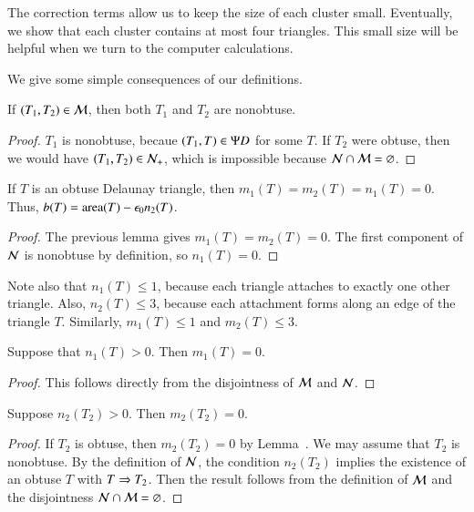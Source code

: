 The correction terms allow us to keep the size of each cluster small.  Eventually, we show that each
cluster contains at most four triangles.  This small size will be helpful when we turn to the computer calculations.

We give  some simple consequences of our definitions.

\begin{lemma} If $(T_1,T_2)\in \mathcal M$, then both $T_1$ and $T_2$ are nonobtuse.
\end{lemma}

\begin{proof}  $T_1$ is nonobtuse, becaue $(T_1,T)\in\Psi D$ for some $T$.
If $T_2$ were obtuse, then we would have $(T_1,T_2)\in \mathcal N_+$, which is impossible
because $\mathcal N\cap \mathcal M = \varnothing$.
\end{proof}

\begin{lemma}[obtuse $b$]  If $T$ is an obtuse Delaunay triangle, then $m_1(T)=m_2(T)=n_1(T)=0$.
Thus, $b(T) = {\operatorname{area}}(T) - \epsilon_0 n_2(T)$.
\end{lemma}

\begin{proof}  The previous lemma gives $m_1(T)=m_2(T)=0$.  The first component of
$\mathcal N$ is nonobtuse by definition, so $n_1(T)=0$.
\end{proof}

\begin{remark}
  Note also that $n_1(T)\le 1$, because each triangle attaches to
  exactly one other triangle.  Also, $n_2(T)\le 3$, because each
  attachment forms along an edge of the triangle $T$.  Similarly,
  $m_1(T)\le 1$ and $m_2(T)\le 3$.
\end{remark}

\begin{lemma}  Suppose that $n_1(T)>0$. Then $m_1(T)=0$.
\end{lemma}

\begin{proof} This follows directly from the disjointness of $\mathcal M$ and $\mathcal N$.
\end{proof}

\begin{lemma}  Suppose $n_2(T_2)>0$.  Then $m_2(T_2)=0$.
\end{lemma}

\begin{proof} If $T_2$ is obtuse, then $m_2(T_2)=0$ by Lemma~.
We may assume that $T_2$ is nonobtuse.
By the definition of $\mathcal N$, the condition $n_2(T_2)$ implies the existence of an obtuse $T$ with $T\Rightarrow T_2$.
Then the result follows from the definition of $\mathcal M$ and the disjointness $\mathcal N\cap\mathcal M = \varnothing$.
\end{proof}



